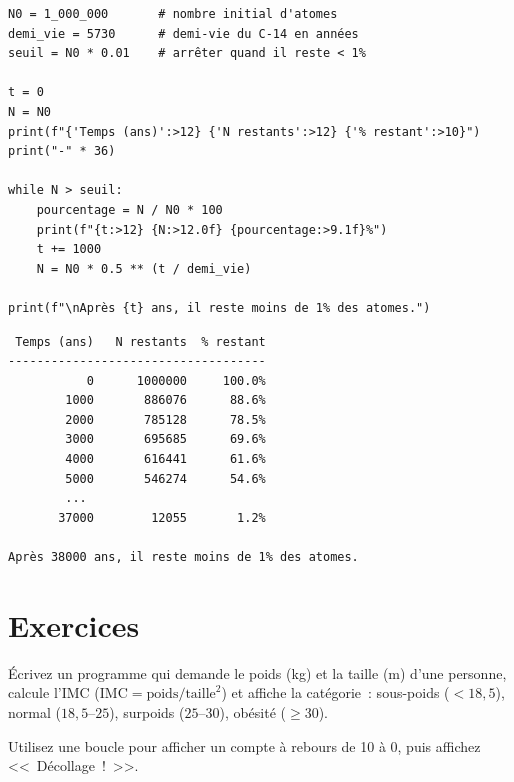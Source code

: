 \begin{codeblock}[title=\textbf{Python}]
\begin{verbatim}
N0 = 1_000_000       # nombre initial d'atomes
demi_vie = 5730      # demi-vie du C-14 en années
seuil = N0 * 0.01    # arrêter quand il reste < 1%

t = 0
N = N0
print(f"{'Temps (ans)':>12} {'N restants':>12} {'% restant':>10}")
print("-" * 36)

while N > seuil:
    pourcentage = N / N0 * 100
    print(f"{t:>12} {N:>12.0f} {pourcentage:>9.1f}%")
    t += 1000
    N = N0 * 0.5 ** (t / demi_vie)

print(f"\nAprès {t} ans, il reste moins de 1% des atomes.")
\end{verbatim}
\end{codeblock}

\begin{codeoutput}
\begin{verbatim}
 Temps (ans)   N restants  % restant
------------------------------------
           0      1000000     100.0%
        1000       886076      88.6%
        2000       785128      78.5%
        3000       695685      69.6%
        4000       616441      61.6%
        5000       546274      54.6%
        ...
       37000        12055       1.2%

Après 38000 ans, il reste moins de 1% des atomes.
\end{verbatim}
\end{codeoutput}

\section{Exercices}

\begin{exercice}
\'Ecrivez un programme qui demande le poids (kg) et la taille (m) d'une personne,
calcule l'IMC ($\text{IMC} = \text{poids} / \text{taille}^2$) et affiche la
cat\'egorie~: sous-poids ($<18{,}5$), normal ($18{,}5$--$25$), surpoids ($25$--$30$),
ob\'esit\'e ($\geq 30$).
\end{exercice}

\begin{exercice}
Utilisez une boucle  pour afficher un compte \`a rebours de 10 \`a 0,
puis affichez <<~D\'ecollage~!~>>.
\end{exercice}

